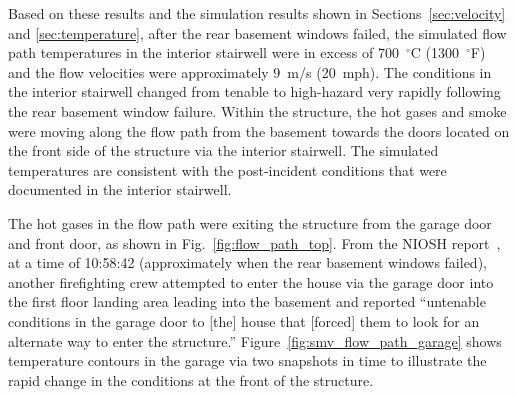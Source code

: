 \documentclass[12pt,oneside]{book}
\begin{document}
Based on these results and the simulation results shown in Sections~\ref{sec:velocity} and \ref{sec:temperature}, after the rear basement windows failed, the simulated flow path temperatures in the interior stairwell were in excess of 700~$^{\circ}$C (1300~$^{\circ}$F) and the flow velocities were approximately 9~m/s (20~mph). The conditions in the interior stairwell changed from tenable to high-hazard very rapidly following the rear basement window failure. Within the structure, the hot gases and smoke were moving along the flow path from the basement towards the doors located on the front side of the structure via the interior stairwell. The simulated temperatures are consistent with the post-incident conditions that were documented in the interior stairwell.

The hot gases in the flow path were exiting the structure from the garage door and front door, as shown in Fig.~\ref{fig:flow_path_top}. From the NIOSH report~\cite{NIOSH:Bowyer2}, at a time of 10:58:42 (approximately when the rear basement windows failed), another firefighting crew attempted to enter the house via the garage door into the first floor landing area leading into the basement and reported ``untenable conditions in the garage door to [the] house that [forced] them to look for an alternate way to enter the structure.'' Figure~\ref{fig:smv_flow_path_garage} shows temperature contours in the garage via two snapshots in time to illustrate the rapid change in the conditions at the front of the structure.
\end{document}
